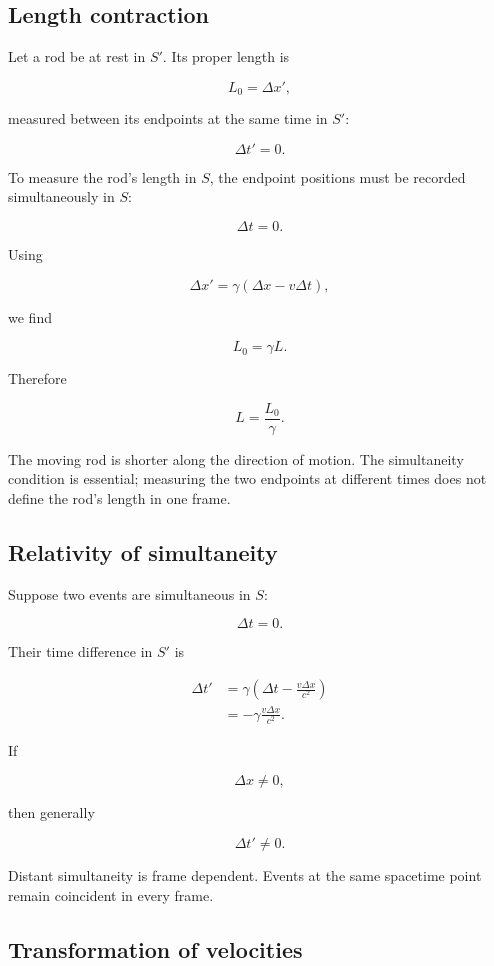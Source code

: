 \subsection{Length contraction}

Let a rod be at rest in \(S'\). Its proper length is

\[
L_{0}
=
\Delta x',
\]

measured between its endpoints at the same time in \(S'\):

\[
\Delta t'=0.
\]

To measure the rod's length in \(S\), the endpoint positions must be recorded simultaneously in \(S\):

\[
\Delta t=0.
\]

Using

\[
\Delta x'
=
\gamma(\Delta x-v\Delta t),
\]

we find

\[
L_{0}
=
\gamma L.
\]

Therefore

\[
\boxed{
L
=
\frac{L_{0}}{\gamma}
}.
\]

The moving rod is shorter along the direction of motion. The simultaneity condition is essential; measuring the two endpoints at different times does not define the rod's length in one frame.

\subsection{Relativity of simultaneity}

Suppose two events are simultaneous in \(S\):

\[
\Delta t=0.
\]

Their time difference in \(S'\) is

\[
\begin{aligned}
\Delta t'
&=
\gamma\left(
\Delta t-
\frac{v\Delta x}{c^{2}}
\right)\\
&=
-\gamma
\frac{v\Delta x}{c^{2}}.
\end{aligned}
\]

If

\[
\Delta x\neq0,
\]

then generally

\[
\boxed{
\Delta t'\neq0
}.
\]

Distant simultaneity is frame dependent. Events at the same spacetime point remain coincident in every frame.

\subsection{Transformation of velocities}


